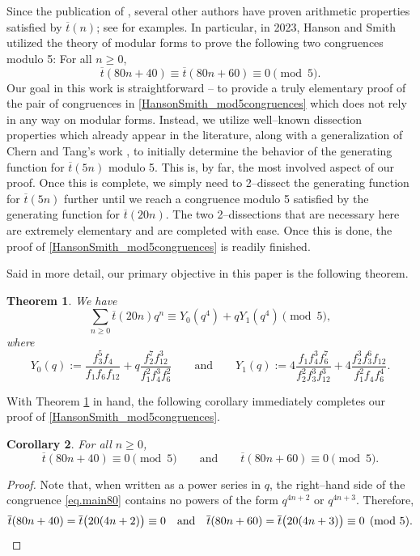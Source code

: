 \documentclass{amsart}
\newtheorem{theorem}{Theorem}[section]
\newtheorem{corollary}[theorem]{Corollary}
\theoremstyle{definition}
\newcommand{\tbar}{\overline{t}}
\begin{document}
Since the publication of \cite{BDLM}, several other authors have proven arithmetic properties satisfied by $\overline{t}(n)$; see \cite{CH2019, GJ2025, HS2023, HS2020, LLWX, Zhang2025, Zhang2026} for examples.  In particular, in 2023, Hanson and Smith \cite{HS2023} utilized the theory of modular forms to prove the following two congruences modulo 5:  For all $n\geq 0$, 
\begin{equation}
\label{HansonSmith_mod5congruences}
\overline{t}(80n+40)\equiv \overline{t}(80n+60)\equiv 0 \pmod{5}.
\end{equation}
Our goal in this work is straightforward -- to provide a truly elementary proof of the pair of congruences in \eqref{HansonSmith_mod5congruences} which does not rely in any way on modular forms.  Instead, we utilize well--known dissection properties which already appear in the literature, along with a generalization of Chern and Tang's work \cite{CT2021}, to initially determine the behavior of the generating function for $\overline{t}(5n)$ modulo 5.  This is, by far, the most involved aspect of our proof.  Once this is complete, we simply need to 2--dissect the generating function for $\overline{t}(5n)$ further until we reach a congruence modulo 5 satisfied by the generating function for $\overline{t}(20n)$.  The two 2--dissections that are necessary here are extremely elementary and are completed with ease.  Once this is done, the proof of \eqref{HansonSmith_mod5congruences} is readily finished. 

Said in more detail, our primary objective in this paper is the following theorem.  
\begin{theorem}\label{thm.20n}
We have
\begin{equation}
\sum_{n\ge0}\tbar(20n)q^{n}\equiv Y_0(q^{4})+qY_1(q^{4})\pmod5,
\label{eq.main80}
\end{equation}
where
\begin{equation*}
Y_0(q):=\frac{f_3^{5}f_4}{f_1f_6f_{12}}
+q\frac{f_2^{7}f_{12}^{3}}{f_1^{2}f_4^{3}f_6^{2}} \qquad \text{and}\qquad 
Y_1(q):=4\frac{f_1f_4^{3}f_6^{7}}{f_2^{2}f_3^{3}f_{12}^{3}}
+4\frac{f_2^{3}f_3^{6}f_{12}}{f_1^{2}f_4f_6^{4}}.
\end{equation*}
\end{theorem}
With Theorem \ref{thm.20n} in hand, the following corollary immediately completes our proof of \eqref{HansonSmith_mod5congruences}.  
\begin{corollary}\label{cor.80}
For all $n\ge0$,
\[
\tbar(80n+40)\equiv0\pmod5
\qquad\text{and}\qquad
\tbar(80n+60)\equiv0\pmod5 .
\]
\end{corollary}
\begin{proof}
Note that, when written as a power series in $q$, the right--hand side of the congruence \eqref{eq.main80} contains no powers of the form $q^{4n+2}$ or $q^{4n+3}$.  Therefore,
\[
\tbar(80n+40)=\tbar\bigl(20(4n+2)\bigr)\equiv0
\quad\text{and}\quad
\tbar(80n+60)=\tbar\bigl(20(4n+3)\bigr)\equiv0\pmod5. \qedhere
\]\end{proof}
\end{document}
